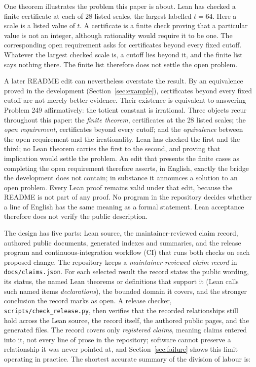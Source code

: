 \documentclass[11pt]{article}
\begin{document}
One theorem illustrates the problem this paper is about.  Lean has checked a
finite certificate at each of 28 listed scales, the largest labelled
$t = 64$.  Here a scale is a listed value of $t$.  A certificate is a
finite check proving that a particular value is not an integer, although
rationality would require it to be one.  The corresponding open requirement asks for
certificates beyond every fixed cutoff.  Whatever the largest checked scale
is, a cutoff lies beyond it, and the finite list says nothing there.  The
finite list therefore does not settle the open problem.

A later README edit can nevertheless overstate the result.  By an equivalence
proved in the development
(Section~\ref{sec:example}),
certificates beyond every fixed cutoff are not merely better evidence.  Their
existence is equivalent to answering Problem 249 affirmatively: the totient
constant is irrational.  Three objects recur throughout this paper: the \emph{finite
theorem}, certificates at the 28 listed scales; the \emph{open
requirement}, certificates beyond every cutoff; and the \emph{equivalence}
between the open requirement and the irrationality.  Lean has checked the
first and the third; no Lean theorem carries the first to the second, and
proving that implication would settle the problem.  An edit that presents the finite
cases as completing the open requirement therefore asserts, in English,
exactly the bridge the development does not contain; in substance it
announces a solution to an open problem.  Every Lean proof remains valid under
that edit, because the README is not part of any proof.  No program in the
repository decides whether a line of English has the same meaning as a formal
statement.  Lean acceptance therefore does not verify the public description.

The design has five parts: Lean source, the maintainer-reviewed claim
record, authored public documents, generated
indexes and summaries, and the release program and continuous-integration
workflow (CI) that runs both checks on each proposed change.
The repository keeps a \emph{maintainer-reviewed claim record} in
\texttt{docs/claims.json}.  For each selected result the record
states the public wording, its status, the named Lean theorems or definitions
that support it (Lean calls such named items \emph{declarations}), the bounded
domain it covers, and the stronger conclusion the record marks as open.
A release checker,
\texttt{scripts/\allowbreak check\_\allowbreak release.py}, then verifies that the
recorded relationships still hold across the Lean source, the record itself,
the authored public pages, and the generated files.  The record covers only
\emph{registered claims}, meaning claims entered into it, not every line of prose in the repository;
software cannot preserve a relationship it was never pointed at, and
Section~\ref{sec:failure} shows this limit operating in practice.  The
shortest accurate summary of the division of labour is:
\end{document}
